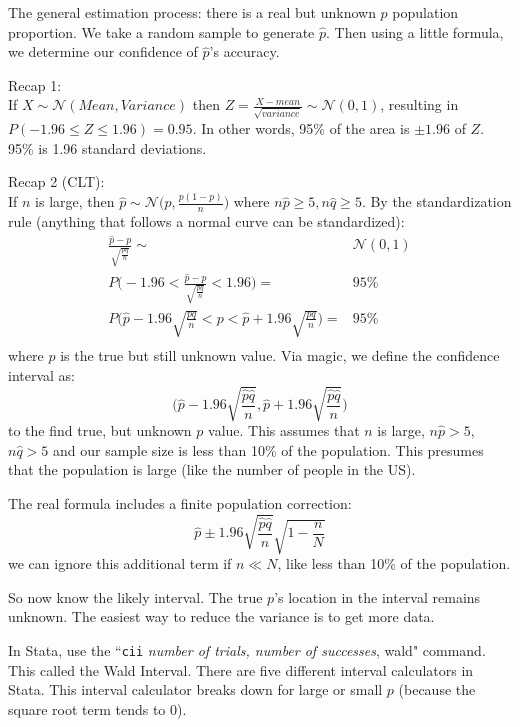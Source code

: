 \documentclass[11pt, oneside]{article}   	%
\begin{document}
The general estimation process: there is a real but unknown $p$ population proportion. We take a random sample to generate $\hat{p}$. Then using a little formula, we determine our confidence of $\hat{p}$'s accuracy.

Recap 1:\\
If $X \sim \mathcal{N}(Mean, Variance)$ then $Z = \frac{X - mean} {\sqrt{variance}} \sim \mathcal{N}(0,1)$, resulting in $P(-1.96 \leq Z \leq 1.96) = 0.95$. In other words, 95\% of the area is $\pm 1.96$ of $Z$. 95\% is 1.96 standard deviations.

Recap 2 (CLT):\\
If $n$ is large, then $\hat{p} \sim \mathcal{N}\bigg( p, \frac{p(1-p)} {n} \bigg)$ where $n\hat{p} \geq 5, n\hat{q} \geq 5$. By the standardization rule (anything that follows a normal curve can be standardized):
\begin{align*}
\frac{\hat{p} - p} {\sqrt{\frac{pq}{n}}} \sim& \mathcal{N}(0,1)\\
P\bigg(-1.96 < \frac{\hat{p} - p} {\sqrt{\frac{pq}{n}}} < 1.96\bigg) =& 95\% \\
P\bigg(\hat{p} -1.96\sqrt{ \frac{pq} {n} }  < p < \hat{p} +1.96\sqrt{ \frac{pq} {n} }\bigg) =& 95\% \\
\end{align*}
where $p$ is the true but still unknown value. Via magic, we define the confidence interval as:
\[
\bigg(\hat{p} -1.96\sqrt{ \frac{\hat{p}\hat{q}} {n} }, \hat{p} +1.96\sqrt{ \frac{\hat{p}\hat{q}} {n} }\bigg) 
\]
to the find true, but unknown $p$ value. This assumes that $n$ is large, $n\hat{p} > 5$, $n\hat{q} > 5$ and our sample size is less than 10\% of the population. This presumes that the population is large (like the number of people in the US).

The real formula includes a finite population correction:
\[
\hat{p} \pm 1.96 \sqrt{\frac{\hat{p}\hat{q}} {n} } \sqrt{ 1- \frac {n} {N} } 
\]
we can ignore this additional term if $n \ll N$, like less than 10\% of the population.

So now know the likely interval. The true $p$'s location in the interval remains unknown. The easiest way to reduce the variance is to get more data.

In Stata, use the ``\texttt{cii} \textit{number of trials, number of successes}, wald" command.  This called the Wald Interval. There are five different interval calculators in Stata. This interval calculator breaks down for large or small $p$ (because the square root term tends to 0).
\end{document}
